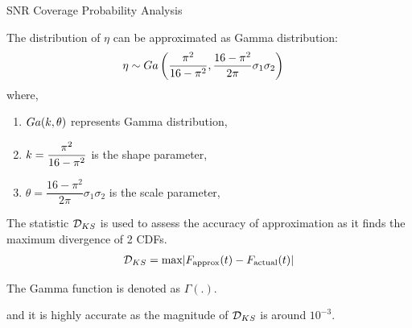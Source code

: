 \documentclass{beamer}
\begin{document}
\begin{frame}{SNR Coverage Probability Analysis}
    \begin{block}{}
        \begin{enumerate}
            \small{
            \item [1.]The distribution of $\eta$ can be approximated as Gamma distribution:
            \begin{align}
                    \eta &\sim \mathnormal{Ga}\left(\frac{\pi^2}{16 - \pi^2},\frac{16 - \pi^2}{2\pi}\sigma_1\sigma_2\right)
            \end{align}
            where,
            \begin{enumerate}
                \item $\mathnormal{Ga}(k, \theta)$ represents Gamma distribution,
                \item $\mathnormal{k} = \dfrac{\pi^2}{16 - \pi^2}$ is the shape parameter,
                \item $\theta = \dfrac{16 - \pi^2}{2\pi}\sigma_1\sigma_2$ is the scale parameter,
            \end{enumerate}
            \item[2.] The statistic $\mathcal{D_{\mathnormal{KS}}}$ is used to assess the accuracy of approximation as it finds the maximum divergence of 2 CDFs.
            \begin{align}
                \mathcal{D}_{\mathnormal{KS}} = \text{max}|\mathnormal{F}_{\text{approx}}(t) - \mathnormal{F}_{\text{actual}}(t)|
            \end{align}
            \item[3.]The Gamma function is denoted as $\Gamma(.).$} and it is highly accurate as the magnitude of $\mathcal{D}_{\mathnormal{KS}}$ is around $10^{-3}$.
        \end{enumerate}
    \end{block}
\end{frame}
\end{document}
